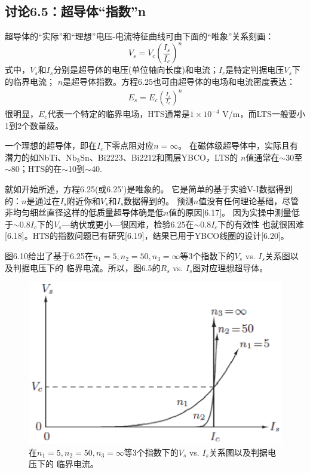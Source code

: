 \subsection{讨论6.5：超导体“指数”n}
超导体的“实际”和“理想”电压-电流特征曲线可由下面的“唯象”关系刻画：
\begin{equation}%
V_s=V_c(\frac{I_s}{I_c})^n
\end{equation}
式中，$V_s$和$I_s$分别是超导体的电压(单位轴向长度)和电流；$I_c$是特定判据电压$V_s$下的临界电流；
$n$是超导体指数。方程6.25也可由超导体的电场和电流密度表达：
\begin{align*}%
E_s=E_c(\frac{I_s}{I_c})^n \tag{6.25'}
\end{align*}
很明显，$E_c$代表一个特定的临界电场，HTS通常是$1\times 10^{-4}$ V/m，而LTS一般要小1到2个数量级。

一个理想的超导体，即在$I_c$下零点阻对应$n=\infty$。
在磁体级超导体中，实际且有潜力的如NbTi、$\mathrm{Nb_3 Sn}$、Bi2223、Bi2212和图层YBCO，LTS的
$n$值通常在$\sim$30至$\sim$80；HTS的在$\sim$10到$\sim$40.

就如开始所述，方程6.25(或6.25')是唯象的。
它是简单的基于实验V-I数据得到的：$n$是通过在$I_s$附近你和$V_s$和$I_s$数据得到的。
预测$n$值没有任何理论基础，尽管非均匀细丝直径这样的低质量超导体确是低$n$值的原因[6.17]。
因为实操中测量低于$\sim 0.8 I_c$下的$V_s$---纳伏或更小---很困难，检验6.25在$\sim 0.8 I_c$下的有效性
也就很困难[6.18]。HTS的指数问题已有研究[6.19]，结果已用于YBCO线圈的设计[6.20]。

图6.10给出了基于6.25在$n_1=5,n_2=50,n_3=\infty$等3个指数下的$V_s$ vs. $I_s$关系图以及判据电压下的
临界电流。所以，图6.5的$R_s$ vs. $I_s$图对应理想超导体。
\begin{figure}[htbp]
	\centering
	\includegraphics[scale=0.6]{chpt6/figs/fig6.10.eps}
	\caption{在$n_1=5,n_2=50,n_3=\infty$等3个指数下的$V_s$ vs. $I_s$关系图以及判据电压下的
		临界电流。}
\end{figure}

